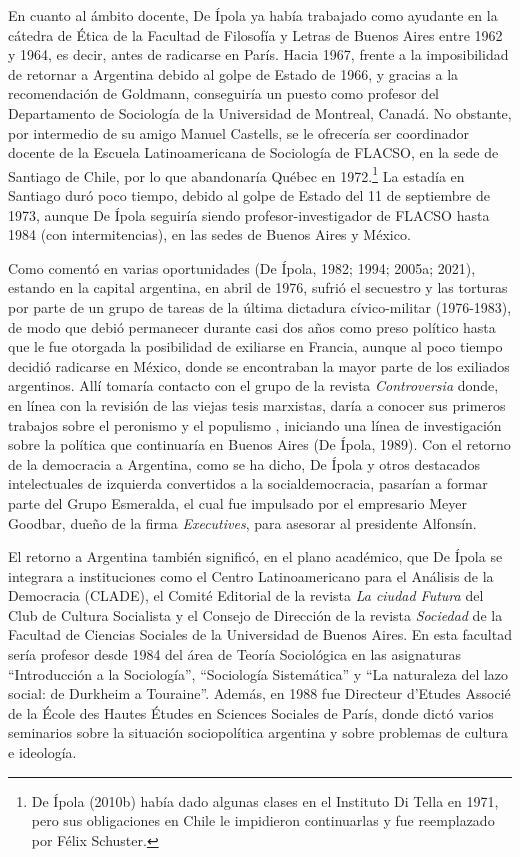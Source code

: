 En cuanto al ámbito docente, De Ípola ya había trabajado como ayudante en la cátedra de Ética de la Facultad de Filosofía y Letras de Buenos Aires entre 1962 y 1964, es decir, antes de radicarse en París. Hacia 1967, frente a la imposibilidad de retornar a Argentina debido al golpe de Estado de 1966, y gracias a la recomendación de Goldmann, conseguiría un puesto como profesor del Departamento de Sociología de la Universidad de Montreal, Canadá. No obstante, por intermedio de su amigo Manuel Castells, se le ofrecería ser coordinador docente de la Escuela Latinoamericana de Sociología de FLACSO, en la sede de Santiago de Chile, por lo que abandonaría Québec en 1972.\footnote{De Ípola (2010b) había dado algunas clases en el Instituto Di Tella en 1971, pero sus obligaciones en Chile le impidieron continuarlas y fue reemplazado por Félix Schuster.} La estadía en Santiago duró poco tiempo, debido al golpe de Estado del 11 de septiembre de 1973, aunque De Ípola seguiría siendo profesor-investigador de FLACSO hasta 1984 (con intermitencias), en las sedes de Buenos Aires y México.

Como comentó en varias oportunidades (De Ípola, 1982; 1994; 2005a; 2021), estando en la capital argentina, en abril de 1976, sufrió el secuestro y las torturas por parte de un grupo de tareas de la última dictadura cívico-militar (1976-1983), de modo que debió permanecer durante casi dos años como preso político hasta que le fue otorgada la posibilidad de exiliarse en Francia, aunque al poco tiempo decidió radicarse en México, donde se encontraban la mayor parte de los exiliados argentinos. Allí tomaría contacto con el grupo de la revista \emph{Controversia} donde, en línea con la revisión de las viejas tesis marxistas, daría a conocer sus primeros trabajos sobre el peronismo y el populismo , iniciando una línea de investigación sobre la política que continuaría en Buenos Aires (De Ípola, 1989). Con el retorno de la democracia a Argentina, como se ha dicho, De Ípola y otros destacados intelectuales de izquierda convertidos a la socialdemocracia, pasarían a formar parte del Grupo Esmeralda, el cual fue impulsado por el empresario Meyer Goodbar, dueño de la firma \emph{Executives}, para asesorar al presidente Alfonsín.

El retorno a Argentina también significó, en el plano académico, que De Ípola se integrara a instituciones como el Centro Latinoamericano para el Análisis de la Democracia (CLADE), el Comité Editorial de la revista \emph{La ciudad Futura} del Club de Cultura Socialista y el Consejo de Dirección de la revista \emph{Sociedad} de la Facultad de Ciencias Sociales de la Universidad de Buenos Aires. En esta facultad sería profesor desde 1984 del área de Teoría Sociológica en las asignaturas \enquote{Introducción a la Sociología}, \enquote{Sociología Sistemática} y \enquote{La naturaleza del lazo social: de Durkheim a Touraine}. Además, en 1988 fue Directeur d'Etudes Associé de la École des Hautes Études en Sciences Sociales de París, donde dictó varios seminarios sobre la situación sociopolítica argentina y sobre problemas de cultura e ideología.

